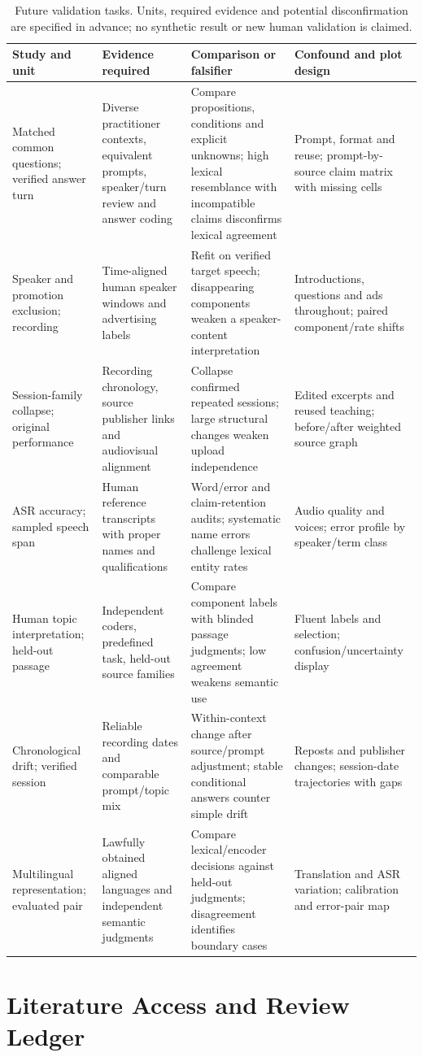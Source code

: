 \begin{table}[t]
\centering\small
\begin{tabular}{p{}p{}p{}p{}}
\toprule
Study and unit & Evidence required & Comparison or falsifier & Confound and plot design\\
\midrule
Matched common questions; verified answer turn & Diverse practitioner contexts, equivalent prompts, speaker/turn review and answer coding & Compare propositions, conditions and explicit unknowns; high lexical resemblance with incompatible claims disconfirms lexical agreement & Prompt, format and reuse; prompt-by-source claim matrix with missing cells\\
Speaker and promotion exclusion; recording & Time-aligned human speaker windows and advertising labels & Refit on verified target speech; disappearing components weaken a speaker-content interpretation & Introductions, questions and ads throughout; paired component/rate shifts\\
Session-family collapse; original performance & Recording chronology, source publisher links and audiovisual alignment & Collapse confirmed repeated sessions; large structural changes weaken upload independence & Edited excerpts and reused teaching; before/after weighted source graph\\
ASR accuracy; sampled speech span & Human reference transcripts with proper names and qualifications & Word/error and claim-retention audits; systematic name errors challenge lexical entity rates & Audio quality and voices; error profile by speaker/term class\\
Human topic interpretation; held-out passage & Independent coders, predefined task, held-out source families & Compare component labels with blinded passage judgments; low agreement weakens semantic use & Fluent labels and selection; confusion/uncertainty display\\
Chronological drift; verified session & Reliable recording dates and comparable prompt/topic mix & Within-context change after source/prompt adjustment; stable conditional answers counter simple drift & Reposts and publisher changes; session-date trajectories with gaps\\
Multilingual representation; evaluated pair & Lawfully obtained aligned languages and independent semantic judgments & Compare lexical/encoder decisions against held-out judgments; disagreement identifies boundary cases & Translation and ASR variation; calibration and error-pair map\\
\bottomrule
\end{tabular}
\caption{Future validation tasks. Units, required evidence and potential disconfirmation are specified in advance; no synthetic result or new human validation is claimed.}
\end{table}

\section{Literature Access and Review Ledger}


